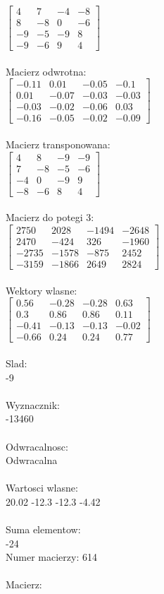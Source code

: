 \documentclass[a4paper,12pt]{article}
\begin{document}
$\begin{bmatrix} 4&7&-4&-8\\8&-8&0&-6\\-9&-5&-9&8\\-9&-6&9&4 \end{bmatrix}$
\\
\\
Macierz odwrotna:\\

$\begin{bmatrix} -0.11&0.01&-0.05&-0.1\\0.01&-0.07&-0.03&-0.03\\-0.03&-0.02&-0.06&0.03\\-0.16&-0.05&-0.02&-0.09 \end{bmatrix}$
\\
\\
Macierz transponowana:\\

$\begin{bmatrix} 4&8&-9&-9\\7&-8&-5&-6\\-4&0&-9&9\\-8&-6&8&4 \end{bmatrix}$
\\
\\
Macierz do potegi 3:\\

$\begin{bmatrix} 2750&2028&-1494&-2648\\2470&-424&326&-1960\\-2735&-1578&-875&2452\\-3159&-1866&2649&2824 \end{bmatrix}$
\\
\\
Wektory wlasne:\\

$\begin{bmatrix} 0.56&-0.28&-0.28&0.63\\0.3&0.86&0.86&0.11\\-0.41&-0.13&-0.13&-0.02\\-0.66&0.24&0.24&0.77 \end{bmatrix}$
\\
\\
Slad:\\
-9
\\
\\
Wyznacznik:\\
-13460
\\
\\
Odwracalnosc:\\
Odwracalna
\\
\\
Wartosci wlasne:\\
20.02 -12.3 -12.3 -4.42
\\
\\
Suma elementow:\\
-24
\\
\newpage
Numer macierzy:
614
\\
\\
Macierz:\\
\end{document}
